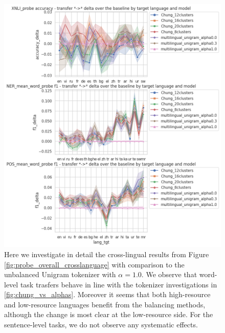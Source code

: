 \begin{figure}[H]
    \centering
    \includegraphics[width=\textwidth]{img/temp/probe_overall_crosslanguage_over_baseline.png}
    \caption{Here we investigate in detail the cross-lingual results from Figure \ref{fig:probe_overall_crosslanguage} with comparison to the unbalanced Unigram tokenizer with $\alpha=1.0$. We observe that word-level task trasfers behave in line with the tokenizer investigations in \ref{fig:chung_vs_alphas}. Moreover it seems that both high-resource and low-resource languages benefit from the balancing methods, although the change is most clear at the low-resource side. For the sentence-level tasks, we do not observe any systematic effects.}
    \label{fig:probe_overall_crosslanguage_over_baseline}
\end{figure}



